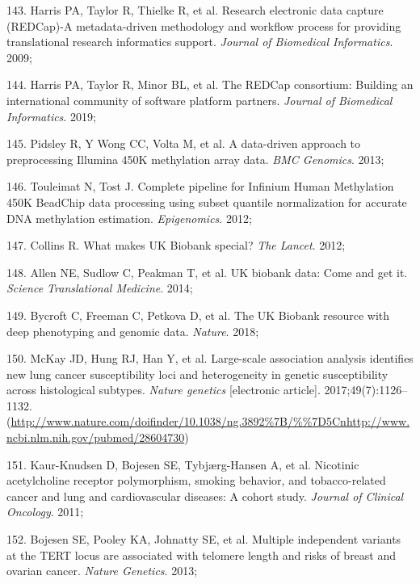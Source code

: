 \documentclass[11pt,twoside]{bristolthesis}
\newenvironment{cslreferences}%
  {}%
  {\par}
\begin{document}
\begin{cslreferences}
\leavevmode\hypertarget{ref-Harris2009}{}%
143. Harris PA, Taylor R, Thielke R, et al. Research electronic data capture (REDCap)-A metadata-driven methodology and workflow process for providing translational research informatics support. \emph{Journal of Biomedical Informatics}. 2009;

\leavevmode\hypertarget{ref-Harris2019}{}%
144. Harris PA, Taylor R, Minor BL, et al. The REDCap consortium: Building an international community of software platform partners. \emph{Journal of Biomedical Informatics}. 2019;

\leavevmode\hypertarget{ref-Pidsley2013}{}%
145. Pidsley R, Y Wong CC, Volta M, et al. A data-driven approach to preprocessing Illumina 450K methylation array data. \emph{BMC Genomics}. 2013;

\leavevmode\hypertarget{ref-Touleimat2012}{}%
146. Touleimat N, Tost J. Complete pipeline for Infinium Human Methylation 450K BeadChip data processing using subset quantile normalization for accurate DNA methylation estimation. \emph{Epigenomics}. 2012;

\leavevmode\hypertarget{ref-Collins2012}{}%
147. Collins R. What makes UK Biobank special? \emph{The Lancet}. 2012;

\leavevmode\hypertarget{ref-Allen2014}{}%
148. Allen NE, Sudlow C, Peakman T, et al. UK biobank data: Come and get it. \emph{Science Translational Medicine}. 2014;

\leavevmode\hypertarget{ref-Bycroft2018}{}%
149. Bycroft C, Freeman C, Petkova D, et al. The UK Biobank resource with deep phenotyping and genomic data. \emph{Nature}. 2018;

\leavevmode\hypertarget{ref-McKay2017}{}%
150. McKay JD, Hung RJ, Han Y, et al. Large-scale association analysis identifies new lung cancer susceptibility loci and heterogeneity in genetic susceptibility across histological subtypes. \emph{Nature genetics} {[}electronic article{]}. 2017;49(7):1126--1132. (\url{http://www.nature.com/doifinder/10.1038/ng.3892\%7B/\%\%7D5Cnhttp://www.ncbi.nlm.nih.gov/pubmed/28604730})

\leavevmode\hypertarget{ref-Kaur-Knudsen2011}{}%
151. Kaur-Knudsen D, Bojesen SE, Tybjærg-Hansen A, et al. Nicotinic acetylcholine receptor polymorphism, smoking behavior, and tobacco-related cancer and lung and cardiovascular diseases: A cohort study. \emph{Journal of Clinical Oncology}. 2011;

\leavevmode\hypertarget{ref-Bojesen2013}{}%
152. Bojesen SE, Pooley KA, Johnatty SE, et al. Multiple independent variants at the TERT locus are associated with telomere length and risks of breast and ovarian cancer. \emph{Nature Genetics}. 2013;


\end{cslreferences}
\end{document}

